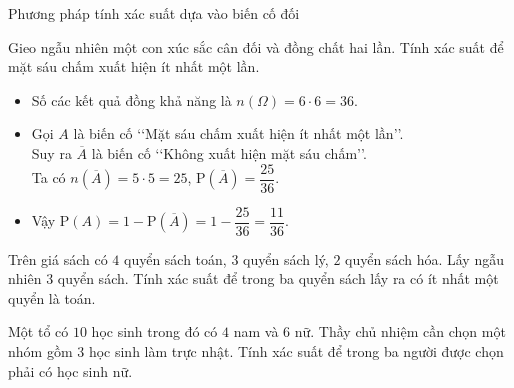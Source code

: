 \begin{dang}{Phương pháp tính xác suất dựa vào biến cố đối}
\end{dang}
\viduminhhoa
\setcounter{vd}{0}
\begin{vd}
	Gieo ngẫu nhiên một con xúc sắc cân đối và đồng chất hai lần. Tính xác suất để mặt sáu chấm xuất hiện ít nhất một lần.
	\loigiai
	{
		\begin{itemize}
			\item Số các kết quả đồng khả năng là $n(\Omega)=6\cdot 6=36$.
			\item Gọi $A$ là biến cố \lq\lq Mặt sáu chấm xuất hiện ít nhất một lần\rq\rq.\\
			Suy ra $\overline{A}$ là biến cố \lq\lq Không xuất hiện mặt sáu chấm\rq\rq .\\
			Ta có $n(\overline{A})=5\cdot 5=25$, $\mathrm{P}(\overline{A})=\dfrac{25}{36}$.
			\item Vậy $\mathrm{P}(A)=1-\mathrm{P}(\overline{A})=1-\dfrac{25}{36}=\dfrac{11}{36}$.
		\end{itemize}
	}
\end{vd}	
\begin{vd}
	Trên giá sách có $4$ quyển sách toán, $3$ quyển sách lý, $2$ quyển sách hóa. Lấy ngẫu nhiên $3$ quyển sách. Tính xác suất để trong ba quyển sách lấy ra có ít nhất một quyển là toán.
\end{vd}
\begin{vd}
	Một tổ có $10$ học sinh trong đó có $4$ nam và $6$ nữ. Thầy chủ nhiệm cần chọn một nhóm gồm $3$ học sinh làm trực nhật. Tính xác suất để trong ba người được chọn phải có học sinh nữ.
\end{vd}
